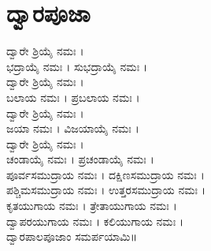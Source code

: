 \section{ದ್ವಾರಪೂಜಾ}
ದ್ವಾರೇ ಶ್ರಿಯೈ  ನಮಃ ।\\
ಭದ್ರಾಯೈ ನಮಃ ।
ಸುಭದ್ರಾಯೈ ನಮಃ ।\\
ದ್ವಾರೇ ಶ್ರಿಯೈ  ನಮಃ ।\\
ಬಲಾಯ ನಮಃ ।
ಪ್ರಬಲಾಯ ನಮಃ ।\\
ದ್ವಾರೇ ಶ್ರಿಯೈ  ನಮಃ ।\\
ಜಯಾ ನಮಃ ।
ವಿಜಯಾಯೈ ನಮಃ ।\\
ದ್ವಾರೇ ಶ್ರಿಯೈ  ನಮಃ ।\\
ಚಂಡಾಯೈ ನಮಃ ।
ಪ್ರಚಂಡಾಯೈ ನಮಃ ।\\
ಪೂರ್ವಸಮುದ್ರಾಯ  ನಮಃ ।
ದಕ್ಷಿಣಸಮುದ್ರಾಯ  ನಮಃ ।\\
ಪಶ್ಚಿಮಸಮುದ್ರಾಯ  ನಮಃ ।
ಉತ್ತರಸಮುದ್ರಾಯ  ನಮಃ ।\\
ಕೃತಯುಗಾಯ ನಮಃ ।
ತ್ರೇತಾಯುಗಾಯ ನಮಃ ।\\
ದ್ವಾಪರಯುಗಾಯ ನಮಃ ।
ಕಲಿಯುಗಾಯ ನಮಃ ।\\
ದ್ವಾರಪಾಲಪೂಜಾಂ ಸಮರ್ಪಯಾಮಿ॥
